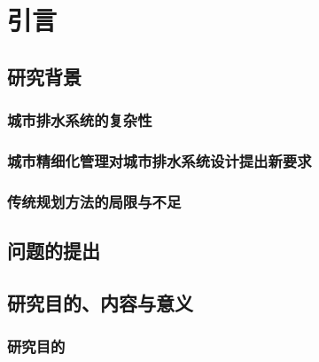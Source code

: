 \documentclass[degree=doctor]{sysuthesis}
\begin{document}
\START


\frontmatter
\begin{abstract}
\end{abstract}

\clearpage
\setcounter{page}{2}
\begin{abstract*}
\end{abstract*}

\clearpage
\setcounter{page}{4}
\showoutput
\tableofcontents
\clearpage
\OMIT

\clearpage
\setcounter{page}{8}
\listoffiguresandtables

\clearpage
\setcounter{page}{9}
\begin{denotation}
  \item
\end{denotation}



\mainmatter
\chapter{引言}
\section{研究背景}
\subsection{城市排水系统的复杂性}

\clearpage
\setcounter{page}{4}
\subsection{城市精细化管理对城市排水系统设计提出新要求}

\clearpage
\setcounter{page}{6}
\subsection{传统规划方法的局限与不足}

\clearpage
\setcounter{page}{7}
\section{问题的提出}

\clearpage
\setcounter{page}{8}
\section{研究目的、内容与意义}
\subsection{研究目的}
\end{document}
